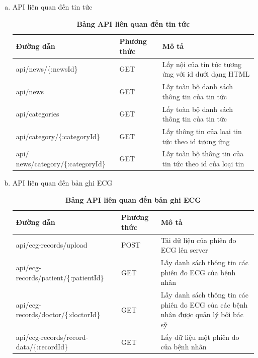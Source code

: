\begin{enumerate}[a)]
\begin{table}[H]
\begin{tabularx}{0.9\textwidth}{
  | >{\raggedright\arraybackslash}X
  | >{\raggedright\arraybackslash}m{2cm}
  | >{\raggedright\arraybackslash}X|
  }
  \end{tabularx}
  \label{table_api_auth}
\end{table}


\item API liên quan đến tin tức


\begin{table}[H]
  \centering
  \caption{\bfseries \fontsize{12pt}{0pt}\selectfont Bảng API liên quan đến tin tức}
  \begin{tabularx}{0.9\textwidth}{
  | >{\raggedright\arraybackslash}X
  | >{\raggedright\arraybackslash}m{2cm}
  | >{\raggedright\arraybackslash}X|
  }
  \hline
  \bfseries Đường dẫn    &\bfseries Phương thức    &\bfseries Mô tả\\ \hline
 api/news/\{:newsId\}   &   GET  & Lấy nội của tin tức tương ứng với id dưới dạng HTML \\ \hline
 api/news   &    GET    & Lấy toàn bộ danh sách thông tin của tin tức \\ \hline
 api/categories  &   GET     & Lấy toàn bộ danh sách thông tin của tin tức \\ \hline
 api/category/\{:categoryId\}   &     GET   & Lấy thông tin của loại tin tức theo id tương ứng \\ \hline
 api/ news/category/\{:categoryId\} &   GET     & Lấy toàn bộ thông tin của tin tức theo id của loại tin \\ \hline

  \end{tabularx}
  \label{table_api_news}
\end{table}

\item API liên quan đến bản ghi ECG


\begin{table}[H]
  \centering
  \caption{\bfseries \fontsize{12pt}{0pt}\selectfont Bảng API liên quan đến bản ghi ECG}
  \begin{tabularx}{0.9\textwidth}{
  | >{\raggedright\arraybackslash}X
  | >{\raggedright\arraybackslash}m{2cm}
  | >{\raggedright\arraybackslash}X|
  }
  \hline
  \bfseries Đường dẫn    &\bfseries Phương thức    &\bfseries Mô tả\\ \hline
 api/ecg-records/upload   &   POST  & Tải dữ liệu của phiên đo ECG lên server \\ \hline
 api/ecg-records/patient/\{:patientId\}   &    GET    & Lấy danh sách thông tin các phiên đo ECG của bệnh nhân \\ \hline
 api/ecg-records/doctor/\{:doctorId\} &   GET     & Lấy danh sách thông tin các phiên đo ECG của các bệnh nhân được quản lý bởi bác sỹ \\ \hline
 api/ecg-records/record-data/\{:recordId\}  &     GET   & Lấy dữ liệu một phiên đo của bệnh nhân \\ \hline


\end{tabularx}
\end{table}
\end{enumerate}
